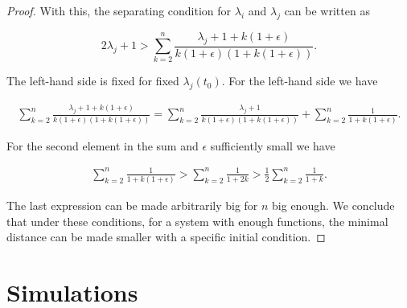 \begin{proof}
    With this, the separating condition for $\lambda_i$ and $\lambda_j$ can be written as

    \begin{equation*}
        2\lambda_j + 1 > \sum_{k=2}^{n} \frac{\lambda_j + 1 + k(1+\epsilon)}{k(1+\epsilon)(1+k(1+\epsilon))}. 
    \end{equation*}

    The left-hand side is fixed for fixed $\lambda_j(t_0)$. For the left-hand side we have

    \begin{align*}
        \sum_{k=2}^{n} \frac{\lambda_j + 1 + k(1+\epsilon)}{k(1+\epsilon)(1+k(1+\epsilon))} = \sum_{k=2}^n \frac{\lambda_j + 1}{k(1+\epsilon)(1+k(1+\epsilon))} + \sum_{k=2}^n \frac{1}{1+k(1+\epsilon)}.
    \end{align*}

    For the second element in the sum and $\epsilon$ sufficiently small we have 

    \begin{align*}
        \sum_{k=2}^n \frac{1}{1+k(1+\epsilon)} > \sum_{k=2}^n \frac{1}{1+2k} > \frac12\sum_{k=2}^n \frac{1}{1+k}.
    \end{align*}

    The last expression can be made arbitrarily big for $n$ big enough. We conclude that under these conditions, for a system with enough functions, the minimal distance can be made smaller with a specific initial condition.
    
\end{proof}

\section{Simulations}


\begin{figure}[h!]
    
\end{figure}

\begin{figure}[h!]
    
\end{figure}

\begin{figure}[h!]
    
\end{figure}